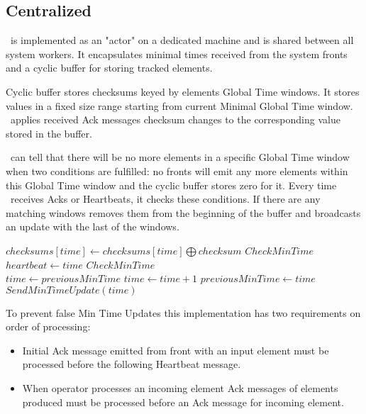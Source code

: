 \subsection{Centralized \tracker\ }

\tracker\ is implemented as an "actor" on a dedicated machine and is shared between all system workers. It encapsulates minimal times received from the system fronts and a cyclic buffer for storing tracked elements.

Cyclic buffer stores checksums keyed by elements Global Time windows. It stores values in a fixed size range starting from current Minimal Global Time window. \tracker\ applies received Ack messages checksum changes to the corresponding value stored in the buffer.

\tracker\ can tell that there will be no more elements in a specific Global Time window when two conditions are fulfilled: no fronts will emit any more elements within this Global Time window and the cyclic buffer stores zero for it. Every time \tracker\ receives Acks or Heartbeats, it checks these conditions. If there are any matching windows \tracker removes them from the beginning of the buffer and broadcasts an update with the last of the windows.

\begin{algorithm}
\caption{\tracker}
\begin{algorithmic}[1]
\State $checksums[time] \gets checksums[time] \bigoplus checksum$
\State $CheckMinTime$
\EndProcedure
\\
\State $heartbeat \gets time$
\State $CheckMinTime$
\EndProcedure
\\
\State $time \gets previousMinTime$
\State $time \gets time + 1$
\EndWhile
{}
\State $previousMinTime \gets time$
\State $SendMinTimeUpdate(time)$
\EndIf
\EndProcedure
\end{algorithmic}
\end{algorithm}

To prevent false Min Time Updates this implementation has two requirements on order of processing:

\begin{itemize}
	\item Initial Ack message emitted from front with an input element must be processed before the following Heartbeat message.
	\item When operator processes an incoming element Ack messages of elements produced must be processed before an Ack message for incoming element.
\end{itemize}


